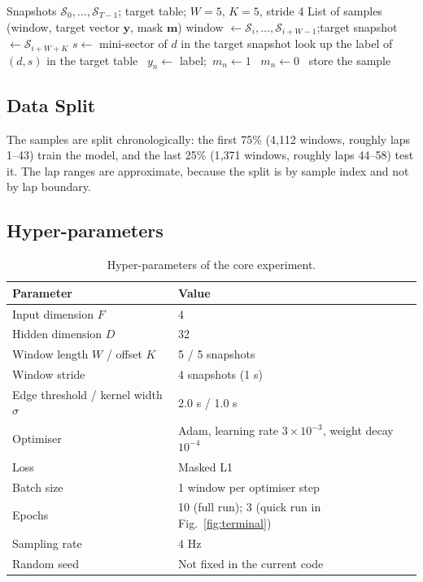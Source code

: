 \documentclass[11pt,a4paper]{article}
\begin{document}
\begin{algorithm}[H]
\caption{Build the window dataset}
\label{alg:dataset}
\begin{algorithmic}[1]
\Require Snapshots $\mathcal{S}_0,\dots,\mathcal{S}_{T-1}$; target table; $W=5$, $K=5$, stride 4
\Ensure List of samples (window, target vector $\mathbf{y}$, mask $\mathbf{m}$)
  \State window $\gets \mathcal{S}_i,\dots,\mathcal{S}_{i+W-1}$;\quad target snapshot $\gets \mathcal{S}_{i+W+K}$
    \State $s \gets$ mini-sector of $d$ in the target snapshot
    \State look up the label of $(d, s)$ in the target table
     \ $y_n \gets$ label;\ $m_n \gets 1$ \Else \ $m_n \gets 0$ \EndIf
  \EndFor
   \ store the sample \EndIf
\EndFor
\end{algorithmic}
\end{algorithm}

\subsection{Data Split}
The samples are split chronologically: the first 75\% (4{,}112 windows,
roughly laps 1--43) train the model, and the last 25\% (1{,}371 windows,
roughly laps 44--58) test it. The lap ranges are approximate, because the
split is by sample index and not by lap boundary.

\subsection{Hyper-parameters}
\begin{table}[H]
\centering
\caption{Hyper-parameters of the core experiment.}
\label{tab:hparams}
\small
\begin{tabular}{@{}ll@{}}
\toprule
\textbf{Parameter} & \textbf{Value} \\
\midrule
Input dimension $F$ & 4 \\
Hidden dimension $D$ & 32 \\
Window length $W$ / offset $K$ & 5 / 5 snapshots \\
Window stride & 4 snapshots (1 s) \\
Edge threshold / kernel width $\sigma$ & 2.0 s / 1.0 s \\
Optimiser & Adam, learning rate $3\times10^{-3}$, weight decay $10^{-4}$ \\
Loss & Masked L1 \\
Batch size & 1 window per optimiser step \\
Epochs & 10 (full run); 3 (quick run in Fig.~\ref{fig:terminal}) \\
Sampling rate & 4 Hz \\
Random seed & Not fixed in the current code \\
\bottomrule
\end{tabular}
\end{table}
\end{document}
